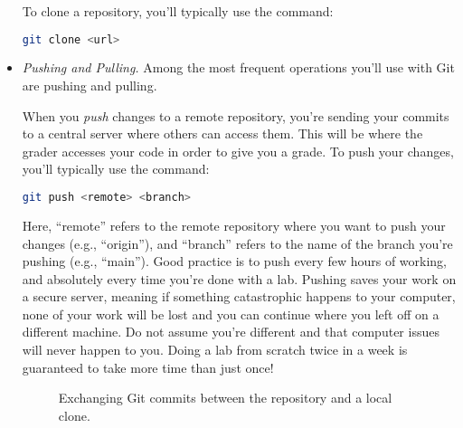 \begin{itemize}
To clone a repository, you'll typically use the command:
\begin{lstlisting}[language=bash]
git clone <url>
\end{lstlisting}

\item \emph{Pushing and Pulling.}
Among the most frequent operations you'll use with Git are pushing and pulling.

When you \emph{push} changes to a remote repository, you're sending your commits to a central server where others can access them.
This will be where the grader accesses your code in order to give you a grade. 
To push your changes, you'll typically use the command:

\begin{lstlisting}[language=bash]
git push <remote> <branch>
\end{lstlisting}

Here, ``remote'' refers to the remote repository where you want to push your changes (e.g., ``origin''), and ``branch'' refers to the name of the branch you're pushing (e.g., ``main'').
Good practice is to push every few hours of working, and absolutely every time you're done with a lab.
Pushing saves your work on a secure server, meaning if something catastrophic happens to your computer, none of your work will be lost and you can continue where you left off on a different machine.
Do not assume you're different and that computer issues will never happen to you.
Doing a lab from scratch twice in a week is guaranteed to take more time than just once!

\begin{figure}[H]
    \centering
    \caption*{Exchanging Git commits between the repository and a local clone.}
\end{figure}


\end{itemize}
